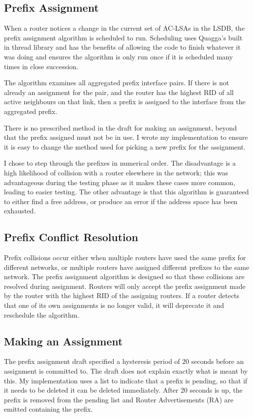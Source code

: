 \documentclass[12pt,a4paper,twoside]{report}
\begin{document}
\subsection{Prefix Assignment}
When a router notices a change in the current set of AC-LSAs in the LSDB, the
prefix assignment algorithm is scheduled to run. Scheduling uses Quagga's built
in thread library and has the benefits of allowing the code to finish whatever
it was doing and ensures the algorithm is only run once if it is scheduled many
times in close succession.

The algorithm examines all aggregated prefix interface pairs. If there is not
already an assignment for the pair, and the router has the highest RID of all
active neighbours on that link, then a prefix is assigned to the interface from
the aggregated prefix. 

There is no prescribed method in the draft for making an assignment, beyond
that the prefix assigned must not be in use. I wrote my implementation to
ensure it is easy to change the method used for picking a new prefix for the
assignment. 

I chose to step through the prefixes in numerical order. The disadvantage is a
high likelihood of collision with a router elsewhere in the network; this was
advantageous during the testing phase as it makes these cases more common,
leading to easier testing. The other advantage is that this algorithm is
guaranteed to either find a free address, or produce an error if the address
space has been exhausted. 

\subsection{Prefix Conflict Resolution}
Prefix collisions occur either when multiple routers have used the same prefix for
different networks, or multiple routers have assigned different prefixes to the
same network. The prefix assignment algorithm is designed so that these
collisions are resolved during assignment. Routers will only accept the prefix
assignment made by the router with the highest RID of the assigning routers. If
a router detects that one of its own assignments is no longer valid, it will
deprecate it and reschedule the algorithm. 

\subsection{Making an Assignment}
\label{pending_list}
The prefix assignment draft specified a hysteresis period of 20 seconds
before an assignment is committed to. The draft does not explain exactly what
is meant by this. My implementation uses a list to indicate that a prefix is
pending, so that if it needs to be deleted it can be deleted immediately. After
20 seconds is up, the prefix is removed from the pending list and Router
Advertisements (RA) are emitted containing the prefix.
 
\end{document}

